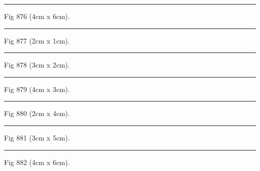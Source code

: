\documentclass[a4paper,11pt]{article}
\begin{document}
\begin{swarmwrap}%
  \begin{minipage}[t]{4cm}
    \centering
    \rule{\linewidth}{6cm}
    {\footnotesize Fig 876 (4cm x 6cm).}
  \end{minipage}%
\end{swarmwrap}%
\swarmwrapnext
\lipsum[126]%

\begin{swarmwrap}%
  \begin{minipage}[t]{2cm}
    \centering
    \rule{\linewidth}{1cm}
    {\footnotesize Fig 877 (2cm x 1cm).}
  \end{minipage}%
\end{swarmwrap}%
\swarmwrapnext
\lipsum[127]%

\begin{swarmwrap}%
  \begin{minipage}[t]{3cm}
    \centering
    \rule{\linewidth}{2cm}
    {\footnotesize Fig 878 (3cm x 2cm).}
  \end{minipage}%
\end{swarmwrap}%
\swarmwrapnext
\lipsum[128]%

\begin{swarmwrap}%
  \begin{minipage}[t]{4cm}
    \centering
    \rule{\linewidth}{3cm}
    {\footnotesize Fig 879 (4cm x 3cm).}
  \end{minipage}%
\end{swarmwrap}%
\swarmwrapnext
\lipsum[129]%

\begin{swarmwrap}%
  \begin{minipage}[t]{2cm}
    \centering
    \rule{\linewidth}{4cm}
    {\footnotesize Fig 880 (2cm x 4cm).}
  \end{minipage}%
\end{swarmwrap}%
\swarmwrapnext
\lipsum[130]%

\begin{swarmwrap}%
  \begin{minipage}[t]{3cm}
    \centering
    \rule{\linewidth}{5cm}
    {\footnotesize Fig 881 (3cm x 5cm).}
  \end{minipage}%
\end{swarmwrap}%
\swarmwrapnext
\lipsum[131]%

\begin{swarmwrap}%
  \begin{minipage}[t]{4cm}
    \centering
    \rule{\linewidth}{6cm}
    {\footnotesize Fig 882 (4cm x 6cm).}
  \end{minipage}%
\end{swarmwrap}%
\swarmwrapnext
\lipsum[132]%
\end{document}
